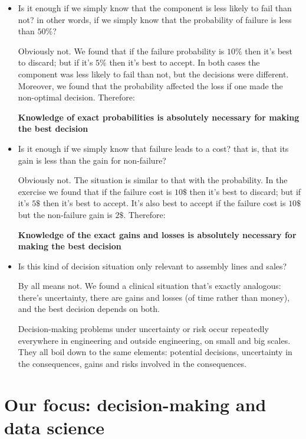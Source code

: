 \documentclass[
  a4paper,
  DIV=11,
  numbers=noendperiod,
  oneside]{scrreprt}
\begin{document}
\begin{itemize}
\item
  Is it enough if we simply know that the component is less likely to
  fail than not? in other words, if we simply know that the probability
  of failure is less than \(50\%\)?

  Obviously not. We found that if the failure probability is \(10\%\)
  then it's best to discard; but if it's \(5\%\) then it's best to
  accept. In both cases the component was less likely to fail than not,
  but the decisions were different. Moreover, we found that the
  probability affected the loss if one made the non-optimal decision.
  Therefore:

  {\textbf{Knowledge of exact probabilities is absolutely necessary for
  making the best decision}}
\item
  Is it enough if we simply know that failure leads to a cost? that is,
  that its gain is less than the gain for non-failure?

  Obviously not. The situation is similar to that with the probability.
  In the exercise we found that if the failure cost is \(10\$\) then
  it's best to discard; but if it's \(5\$\) then it's best to accept.
  It's also best to accept if the failure cost is \(10\$\) but the
  non-failure gain is \(2\$\). Therefore:

  {\textbf{Knowledge of the exact gains and losses is absolutely
  necessary for making the best decision}}
\item
  Is this kind of decision situation only relevant to assembly lines and
  sales?

  By all means not. We found a clinical situation that's exactly
  analogous: there's uncertainty, there are gains and losses (of time
  rather than money), and the best decision depends on both.

  {Decision-making problems under uncertainty or risk occur repeatedly
  everywhere in engineering and outside engineering, on small and big
  scales. They all boil down to the same elements: potential decisions,
  uncertainty in the consequences, gains and risks involved in the
  consequences.}
\end{itemize}

\hypertarget{our-focus-decision-making-and-data-science}{%
\section{Our focus: decision-making and data
science}\label{our-focus-decision-making-and-data-science}}
\end{document}
